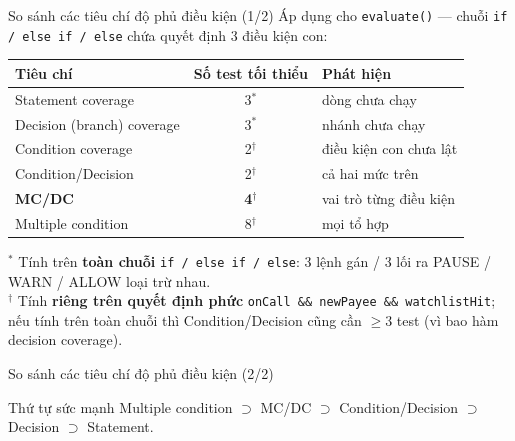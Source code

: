\documentclass[aspectratio=169,12pt]{beamer}
\begin{document}
\begin{frame}{So sánh các tiêu chí độ phủ điều kiện (1/2)}
  Áp dụng cho \texttt{evaluate()} --- chuỗi \texttt{if / else if / else}
  chứa quyết định 3 điều kiện con:

  \vspace{0.3em}
  \begin{center}
  \small
  \begin{tabular}{lcl}
    \toprule
    \textbf{Tiêu chí} & \textbf{Số test tối thiểu} & \textbf{Phát hiện} \\
    \midrule
    Statement coverage           & 3\(^*\) & dòng chưa chạy \\
    Decision (branch) coverage   & 3\(^*\) & nhánh chưa chạy \\
    Condition coverage           & 2\(^\dagger\) & điều kiện con chưa lật \\
    Condition/Decision           & 2\(^\dagger\) & cả hai mức trên \\
    \textbf{MC/DC}               & \textbf{4}\(^\dagger\) & vai trò từng điều kiện \\
    Multiple condition           & 8\(^\dagger\) & mọi tổ hợp \\
    \bottomrule
  \end{tabular}
  \end{center}
  {\scriptsize \(^*\) Tính trên \textbf{toàn chuỗi} \texttt{if / else if
  / else}: 3 lệnh gán / 3 lối ra PAUSE / WARN / ALLOW loại trừ nhau.\\
  \(^\dagger\) Tính \textbf{riêng trên quyết định phức}
  \texttt{onCall \&\& newPayee \&\& watchlistHit}; nếu tính trên toàn
  chuỗi thì Condition/Decision cũng cần $\geq 3$ test (vì bao hàm
  decision coverage).}
\end{frame}

\begin{frame}{So sánh các tiêu chí độ phủ điều kiện (2/2)}
  \begin{exampleblock}{Thứ tự sức mạnh}
    Multiple condition $\supset$ MC/DC $\supset$ Condition/Decision
    $\supset$ Decision $\supset$ Statement.
  \end{exampleblock}
\end{frame}
\end{document}
